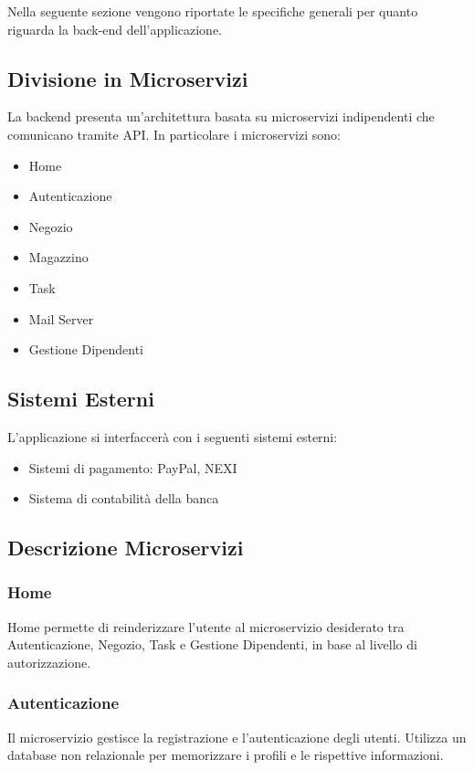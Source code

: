 \documentclass{report}
\begin{document}
Nella seguente sezione vengono riportate le specifiche generali per quanto riguarda la back-end dell’applicazione.

\subsection{Divisione in Microservizi}

La backend presenta un’architettura basata su microservizi indipendenti che comunicano tramite API. In particolare i microservizi sono:
\begin{itemize}
	\item Home
	\item Autenticazione
	\item Negozio
	\item Magazzino
	\item Task
	\item Mail Server
	\item Gestione Dipendenti
\end{itemize}

\subsection{Sistemi Esterni}
L’applicazione si interfaccerà con i seguenti sistemi esterni:

\begin{itemize}
	\item Sistemi di pagamento: PayPal, NEXI
	\item Sistema di contabilità della banca
\end{itemize}

\subsection{Descrizione Microservizi}

\subsubsection*{Home}
Home permette di reinderizzare l'utente al microservizio desiderato tra Autenticazione, Negozio, Task e Gestione Dipendenti, in base al livello di autorizzazione.

\subsubsection*{Autenticazione}
Il microservizio gestisce la registrazione e l'autenticazione degli utenti. Utilizza un database non relazionale per memorizzare i profili e le rispettive informazioni.
\end{document}
